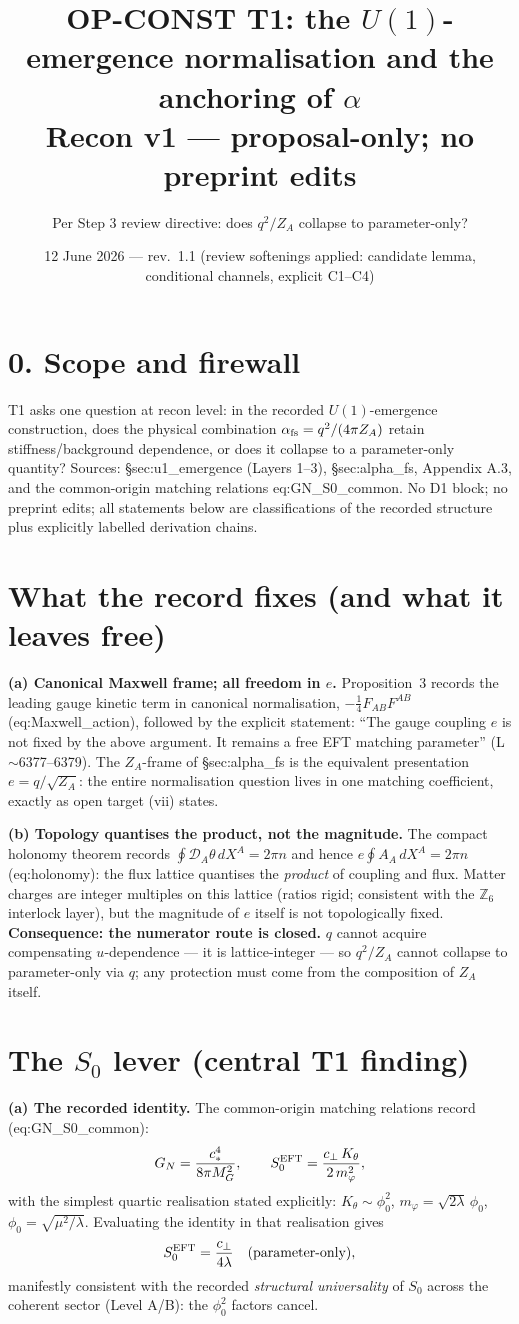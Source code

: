\documentclass[11pt,a4paper]{article}
\title{\textbf{OP-CONST T1: the $U(1)$-emergence normalisation and the anchoring
of $\alpha$}\\\large Recon v1 --- proposal-only; no preprint edits}
\author{Per Step 3 review directive: does $q^2/Z_A$ collapse to parameter-only?}
\date{12 June 2026 --- rev.~1.1 (review softenings applied: candidate lemma, conditional channels, explicit C1--C4)}
\begin{document}
\maketitle

\section*{0. Scope and firewall}
T1 asks one question at recon level: in the recorded $U(1)$-emergence construction,
does the physical combination $\alpha_{\rm fs}=q^2/(4\pi Z_A)$ retain
stiffness/background dependence, or does it collapse to a parameter-only quantity?
Sources: \S sec:u1\_emergence (Layers 1--3), \S sec:alpha\_fs, Appendix A.3, and the
common-origin matching relations eq:GN\_S0\_common. No D1 block; no preprint edits;
all statements below are classifications of the recorded structure plus explicitly
labelled derivation chains.

\section{What the record fixes (and what it leaves free)}
\textbf{(a) Canonical Maxwell frame; all freedom in $e$.} Proposition~3 records the
leading gauge kinetic term in canonical normalisation, $-\tfrac14 F_{AB}F^{AB}$
(eq:Maxwell\_action), followed by the explicit statement: ``The gauge coupling $e$
is not fixed by the above argument. It remains a free EFT matching parameter''
(L$\sim$6377--6379). The $Z_A$-frame of \S sec:alpha\_fs is the equivalent
presentation $e=q/\sqrt{Z_A}$: the entire normalisation question lives in one
matching coefficient, exactly as open target (vii) states.

\textbf{(b) Topology quantises the product, not the magnitude.} The compact
holonomy theorem records $\oint\mathcal D_A\theta\,dX^A=2\pi n$ and hence
$e\oint A_A\,dX^A=2\pi n$ (eq:holonomy): the flux lattice quantises the
\emph{product} of coupling and flux. Matter charges are integer multiples on this
lattice (ratios rigid; consistent with the $\mathbb Z_6$ interlock layer), but the
magnitude of $e$ itself is not topologically fixed. \textbf{Consequence: the
numerator route is closed.} $q$ cannot acquire compensating $u$-dependence ---
it is lattice-integer --- so $q^2/Z_A$ cannot collapse to parameter-only via $q$;
any protection must come from the composition of $Z_A$ itself.

\section{The $S_0$ lever (central T1 finding)}
\textbf{(a) The recorded identity.} The common-origin matching relations record
(eq:GN\_S0\_common):
\[
G_N=\frac{c_*^4}{8\pi M_G^2},
\qquad
S_0^{\rm EFT}=\frac{c_\perp\,K_\theta}{2\,m_\varphi^2},
\]
with the simplest quartic realisation stated explicitly: $K_\theta\sim\phi_0^2$,
$m_\varphi=\sqrt{2\lambda}\,\phi_0$, $\phi_0=\sqrt{\mu^2/\lambda}$. Evaluating the
identity in that realisation gives
\[
S_0^{\rm EFT}=\frac{c_\perp}{4\lambda}\quad\text{(parameter-only)},
\]
manifestly consistent with the recorded \emph{structural universality} of $S_0$
across the coherent sector (Level A/B): the $\phi_0^2$ factors cancel.
\end{document}
